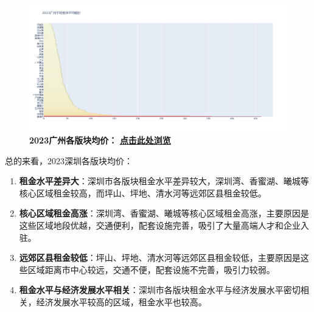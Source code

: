 \documentclass[lang=cn,11pt,a4paper]{elegantpaper}
\begin{document}
\begin{figure}[H]
    \centering
    \begin{minipage}{0.9\textwidth}
        \centering
        \includegraphics[width=\textwidth]{image/2023广州各版块.png}
        \textbf{2023广州各版块均价：} \href{https://yangchen-1318434888.cos.ap-beijing.myqcloud.com/images/2023%E5%B9%BF%E5%B7%9E%E4%B8%8D%E5%90%8C%E6%9D%BF%E5%9D%97%E5%B9%B3%E5%9D%87%E7%A7%9F%E4%BB%B7.html}{\textbf{点击此处浏览}}
    \end{minipage}
\end{figure}

总的来看，2023深圳各版块均价：

\begin{enumerate}
    \item \textbf{租金水平差异大}：深圳市各版块租金水平差异较大，深圳湾、香蜜湖、曦城等核心区域租金较高，而坪山、坪地、清水河等远郊区县租金较低。
    \item \textbf{核心区域租金高涨}：深圳湾、香蜜湖、曦城等核心区域租金高涨，主要原因是这些区域地段优越，交通便利，配套设施完善，吸引了大量高端人才和企业入驻。
    \item \textbf{远郊区县租金较低}：坪山、坪地、清水河等远郊区县租金较低，主要原因是这些区域距离市中心较远，交通不便，配套设施不完善，吸引力较弱。
    \item \textbf{租金水平与经济发展水平相关}：深圳市各版块租金水平与经济发展水平密切相关，经济发展水平较高的区域，租金水平也较高。
\end{enumerate}
\end{document}
